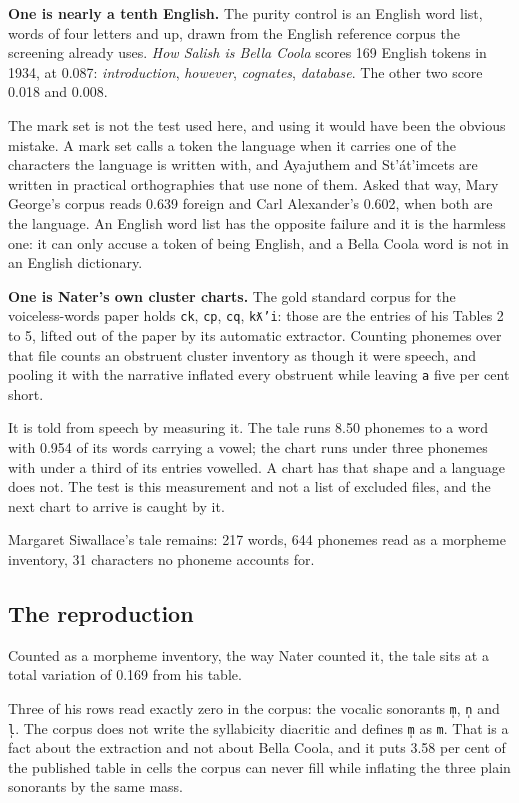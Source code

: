 \textbf{One is nearly a tenth English.} The purity control is an English word list, words of four
letters and up, drawn from the English reference corpus the screening already uses. \emph{How Salish is
Bella Coola} \cite{src:Nater-2013} scores 169 English tokens in 1934, at
0.087: \emph{introduction}, \emph{however}, \emph{cognates}, \emph{database}. The other two score
0.018 and 0.008.

The mark set is not the test used here, and using it would have been the obvious mistake. A mark set
calls a token the language when it carries one of the characters the language is written with, and
Ayajuthem and St'át'imcets are written in practical orthographies that use none of them. Asked that
way, Mary George's corpus reads 0.639 foreign and Carl Alexander's 0.602, when both are the
language. An English word list has the opposite failure and it is the harmless one: it can only
accuse a token of being English, and a Bella Coola word is not in an English dictionary.

\textbf{One is Nater's own cluster charts.} The gold standard corpus for the voiceless-words paper holds
\texttt{ck}, \texttt{cp}, \texttt{cq}, \texttt{kƛ'i}: those are the entries of his Tables 2 to 5,
lifted out of the paper by its automatic extractor. Counting phonemes over that file counts an obstruent cluster
inventory as though it were speech, and pooling it with the narrative inflated every obstruent while
leaving \texttt{a} five per cent short.

It is told from speech by measuring it. The tale runs 8.50 phonemes to a word with 0.954 of its
words carrying a vowel; the chart runs under three phonemes with under a third of its entries
vowelled. A chart has that shape and a language does not. The test is this measurement and not a
list of excluded files, and the next chart to arrive is caught by it.

Margaret Siwallace's tale remains: 217 words, 644 phonemes read as a morpheme inventory,
31 characters no phoneme accounts for.

\subsection{The reproduction}

Counted as a morpheme inventory, the way Nater counted it, the tale sits at a total variation of
0.169 from his table.

Three of his rows read exactly zero in the corpus: the vocalic sonorants \texttt{m̩}, \texttt{n̩} and
\texttt{l̩}. The corpus does not write the syllabicity diacritic and defines \texttt{m̩} as
\texttt{m}. That is a fact about the extraction and not about Bella Coola, and it puts 3.58 per cent
of the published table in cells the corpus can never fill while inflating the three plain sonorants
by the same mass.

